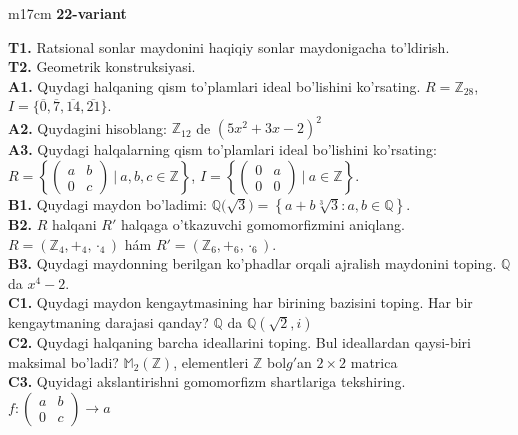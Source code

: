 \documentclass{article}
\begin{document}
\begin{tabular}{m{17cm}}
\textbf{22-variant}
\newline

\textbf{T1.} Ratsional sonlar maydonini haqiqiy sonlar maydonigacha to'ldirish. \\
\textbf{T2.} Geometrik konstruksiyasi. \\
\textbf{A1.} Quydagi halqaning qism to'plamlari ideal bo'lishini ko'rsating.
\(R = \mathbb{Z}_{28}\), \(I = \{\overline{0},\overline{7},\overline{14},\overline{21}\}\). \\
\textbf{A2.} Quydagini hisoblang:
\(\mathbb{Z}_{12}\) de \(\left( 5x^{2} + 3x - 2 \right)^{2}\) \\
\textbf{A3.} Quydagi halqalarning qism to'plamlari ideal bo'lishini ko'rsating: \(R = \left\{ \begin{pmatrix}
a & b \\
0 & c
\end{pmatrix}\ |\ a,b,c \in \mathbb{Z} \right\}\), \(I = \left\{ \begin{pmatrix}
0 & a \\
0 & 0
\end{pmatrix}\ |\ a \in \mathbb{Z} \right\}\). \\
\textbf{B1.} Quydagi maydon bo'ladimi:
\(\mathbb{Q(}\sqrt{3}) = \left\{ a + b\sqrt[3]{3}:a,b \in \mathbb{Q} \right\}\). \\
\textbf{B2.} \(R\) halqani \(R'\) halqaga o'tkazuvchi gomomorfizmini aniqlang.
\(R = (\mathbb{Z}_{4}, +_{4}, \cdot_{4})\) hám \(R' = (\mathbb{Z}_{6}, +_{6}, \cdot_{6})\). \\
\textbf{B3.} Quydagi maydonning berilgan ko'phadlar orqali ajralish maydonini toping.
\(\mathbb{Q}\) da \(x^{4} - 2\). \\
\textbf{C1.} Quydagi maydon kengaytmasining har birining bazisini toping. Har bir kengaytmaning darajasi qanday?
\(\mathbb{Q}\) da \(\mathbb{Q}\left( \sqrt{2},i \right)\) \\
\textbf{C2.} Quydagi halqaning barcha ideallarini toping. Bul ideallardan qaysi-biri maksimal bo'ladi?
\(\mathbb{M}_{2}\left( \mathbb{Z} \right)\), elementleri \(\mathbb{Z}\) bol\(g'\)an \(2 \times 2\) matrica \\
\textbf{C3.} Quyidagi akslantirishni gomomorfizm shartlariga tekshiring. \(f:\begin{pmatrix}
a & b \\
0 & c
\end{pmatrix} \rightarrow a\) \\

\end{tabular}
\vspace{1cm}
\end{document}

